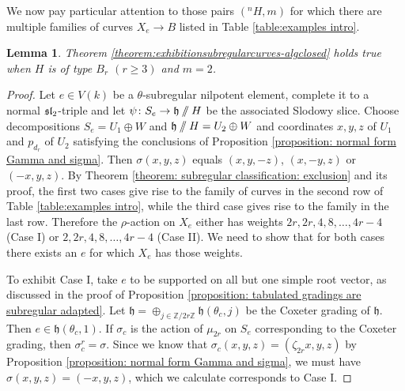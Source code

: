 \documentclass{article} %
\newtheorem{lemma}[proposition]{Lemma}
\numberwithin{equation}{section}
\theoremstyle{definition}
\newcommand{\GIT}{\mathbin{/\mkern-6mu/}}
\newcommand{\frakh}{\mathfrak h}
\newcommand{\bZ}{\mathbb Z}
\newcommand{\rl}{r} %
\begin{document}
We now pay particular attention to those pairs $({}^nH,m)$ for which there are multiple families of curves $X_e\rightarrow B$ listed in Table \ref{table:examples intro}.


\begin{lemma}\label{lemma: subregular curves m2 Bn}
    Theorem \ref{theorem:exhibitionsubregularcurves-algclosed} holds true when $H$ is of type $B_\rl$ $(\rl\geq 3)$ and $m=2$.
\end{lemma}
\begin{proof}
    Let $e\in V(k)$ be a $\theta$-subregular nilpotent element, complete it to a normal $\frak{sl}_2$-triple and let $\psi\colon S_e\rightarrow \frakh\GIT H$ be the associated Slodowy slice.
    Choose decompositions $S_e = U_1 \oplus W$ and $\frakh \GIT H = U_2 \oplus W$ and coordinates $x,y,z$ of $U_1$ and $p_{d_r}$ of $U_2$ satisfying the conclusions of Proposition \ref{proposition: normal form Gamma and sigma}.
    Then $\sigma(x,y,z)$ equals $(x,y,-z)$, $(x,-y,z)$ or $(-x,y,z)$.
    By Theorem \ref{theorem: subregular classification: exclusion} and its proof, the first two cases give rise to the family of curves in the second row of Table \ref{table:examples intro}, while the third case gives rise to the family in the last row.
    Therefore the $\rho$-action on $X_e$ either has weights $2\rl,2\rl,4,8,\dots, 4\rl-4$ (Case I) or $2,2\rl,4,8,\dots, 4\rl-4$ (Case II).
    We need to show that for both cases there exists an $e$ for which $X_e$ has those weights.

    To exhibit Case I, take $e$ to be supported on all but one simple root vector, as discussed in the proof of Proposition \ref{proposition: tabulated gradings are subregular adapted}.
    Let $\frakh = \oplus_{j \in \bZ/2\rl\bZ} \frakh(\theta_c, j)$ be the Coxeter grading of $\frakh$. Then $e \in \frakh(\theta_c, 1)$. 
    If $\sigma_c$ is the action of $\mu_{2\rl}$ on $S_e$ corresponding to the Coxeter grading, then $\sigma_c^\rl = \sigma$. 
    Since we know that $\sigma_c(x,y,z) = (\zeta_{2r}x,y,z)$ by Proposition \ref{proposition: normal form Gamma and sigma}, we must have $\sigma(x,y,z) = (-x,y,z)$, which we calculate corresponds to Case I. 


\end{proof}
\end{document}
